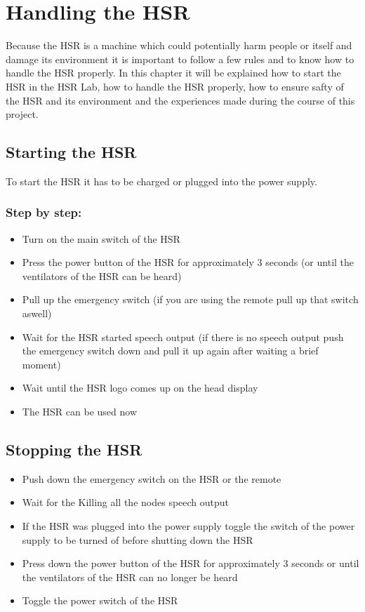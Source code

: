 \documentclass[main.tex]{subfiles}
\begin{document}
	\chapter{Handling the HSR}
	\label{workin_hsr}
	
	Because the HSR is a machine which could potentially harm people or itself and damage its environment it is important to follow a few rules and to know how to handle the HSR properly. In this chapter it will be explained how to start the HSR in the HSR Lab, how to handle the HSR properly, how to ensure safty of the HSR and its environment and the experiences made during the course of this project.

	\section{Starting the HSR}
	To start the HSR it has to be charged or plugged into the power supply.
	\subsection{Step by step:}
	\begin{itemize}
		\item Turn on the main switch of the HSR
		\item Press the power button of the HSR for approximately 3 seconds (or until the ventilators of the HSR can be heard)
		\item Pull up the emergency switch (if you are using the remote pull up that switch aswell)
		\item Wait for the HSR started speech output (if there is no speech output push the emergency switch down and pull it up again after waiting a brief moment)
		\item Wait until the HSR logo comes up on the head display
		\item The HSR can be used now
	\end{itemize}
	\section{Stopping the HSR}
	\begin{itemize}
		\item Push down the emergency switch on the HSR or the remote
		\item Wait for the Killing all the nodes speech output
		\item If the HSR was plugged into the power supply toggle the switch of the power supply to be turned of before shutting down the HSR
		\item Press down the power button of the HSR for approximately 3 seconds or until the ventilators of the HSR can no longer be heard
		\item Toggle the power switch of the HSR
	\end{itemize}
\end{document}

